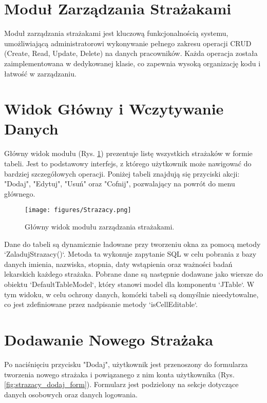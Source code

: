
\section{Moduł Zarządzania Strażakami}
\label{chap:strazacy}

Moduł zarządzania strażakami jest kluczową funkcjonalnością systemu, umożliwiającą administratorowi wykonywanie pełnego zakresu operacji CRUD (Create, Read, Update, Delete) na danych pracowników. Każda operacja została zaimplementowana w dedykowanej klasie, co zapewnia wysoką organizację kodu i łatwość w zarządzaniu.

\section*{Widok Główny i Wczytywanie Danych}
\label{sec:strazacy_widok}

Główny widok modułu (Rys. \ref{fig:strazacy}) prezentuje listę wszystkich strażaków w formie tabeli. Jest to podstawowy interfejs, z którego użytkownik może nawigować do bardziej szczegółowych operacji. Poniżej tabeli znajdują się przyciski akcji: "Dodaj", "Edytuj", "Usuń" oraz "Cofnij", pozwalający na powrót do menu głównego.

\begin{figure}[H]
	\centering
	\texttt{[image: figures/Strazacy.png]}
	\caption{Główny widok modułu zarządzania strażakami.}
	\label{fig:strazacy}
\end{figure}

Dane do tabeli są dynamicznie ładowane przy tworzeniu okna za pomocą metody `ZaladujStrazacy()`. Metoda ta wykonuje zapytanie SQL w celu pobrania z bazy danych imienia, nazwiska, stopnia, daty wstąpienia oraz ważności badań lekarskich każdego strażaka. Pobrane dane są następnie dodawane jako wiersze do obiektu `DefaultTableModel`, który stanowi model dla komponentu `JTable`. W tym widoku, w celu ochrony danych, komórki tabeli są domyślnie nieedytowalne, co jest zdefiniowane przez nadpisanie metody `isCellEditable`.

\section*{Dodawanie Nowego Strażaka}
\label{sec:strazacy_dodaj}

Po naciśnięciu przycisku "Dodaj", użytkownik jest przenoszony do formularza tworzenia nowego strażaka i powiązanego z nim konta użytkownika (Rys. \ref{fig:strazacy_dodaj_form}). Formularz jest podzielony na sekcje dotyczące danych osobowych oraz danych logowania.


